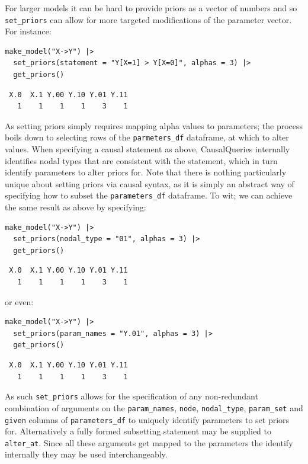 \documentclass[
  article]{jss}
\begin{document}
For larger models it can be hard to provide priors as a vector of
numbers and so \texttt{set\_priors} can allow for more targeted
modifications of the parameter vector. For instance:

\begin{verbatim}
make_model("X->Y") |>
  set_priors(statement = "Y[X=1] > Y[X=0]", alphas = 3) |>
  get_priors()
\end{verbatim}

\begin{verbatim}
 X.0  X.1 Y.00 Y.10 Y.01 Y.11 
   1    1    1    1    3    1 
\end{verbatim}

As setting priors simply requires mapping alpha values to parameters;
the process boils down to selecting rows of the \texttt{parmeters\_df}
dataframe, at which to alter values. When specifying a causal statement
as above, CausalQueries internally identifies nodal types that are
consistent with the statement, which in turn identify parameters to
alter priors for. Note that there is nothing particularly unique about
setting priors via causal syntax, as it is simply an abstract way of
specifying how to subset the \texttt{parameters\_df} dataframe. To wit;
we can achieve the same result as above by specifying:

\begin{verbatim}
make_model("X->Y") |>
  set_priors(nodal_type = "01", alphas = 3) |>
  get_priors()
\end{verbatim}

\begin{verbatim}
 X.0  X.1 Y.00 Y.10 Y.01 Y.11 
   1    1    1    1    3    1 
\end{verbatim}

or even:

\begin{verbatim}
make_model("X->Y") |>
  set_priors(param_names = "Y.01", alphas = 3) |>
  get_priors()
\end{verbatim}

\begin{verbatim}
 X.0  X.1 Y.00 Y.10 Y.01 Y.11 
   1    1    1    1    3    1 
\end{verbatim}

As such \texttt{set\_priors} allows for the specification of any
non-redundant combination of arguments on the \texttt{param\_names},
\texttt{node}, \texttt{nodal\_type}, \texttt{param\_set} and
\texttt{given} columns of \texttt{parameters\_df} to uniquely identify
parameters to set priors for. Alternatively a fully formed subsetting
statement may be supplied to \texttt{alter\_at}. Since all these
arguments get mapped to the parameters the identify internally they may
be used interchangeably.
\end{document}
